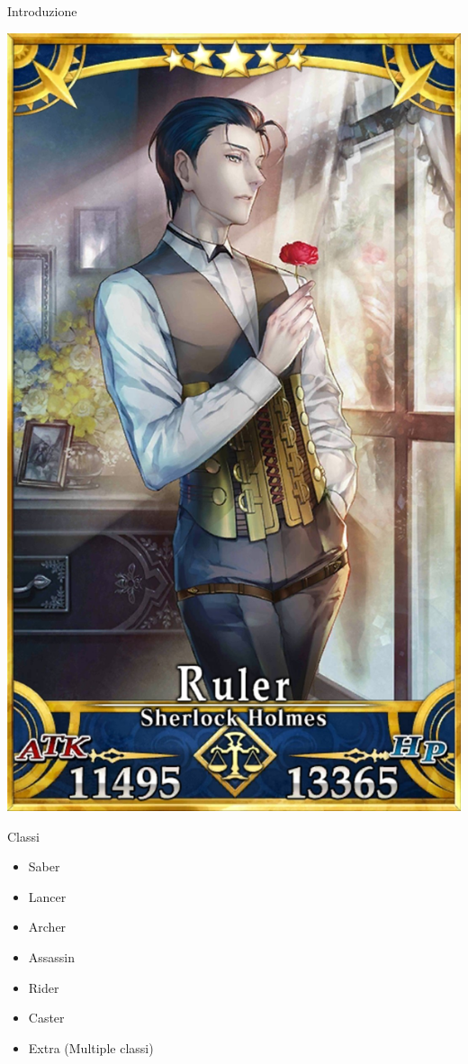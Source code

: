 \documentclass{beamer}
\begin{document}
\begin{darkframes}
\begin{frame}{Introduzione}
\begin{varwidth}{\textwidth}
      \includegraphics[height=0.75\textheight]{./images/servant.png}
    \end{varwidth}
  \end{frame}

  \begin{frame}{Classi}
    \begin{itemize}
      \item Saber
      \item Lancer
      \item Archer
      \item Assassin
      \item Rider
      \item Caster
      \item Extra (Multiple classi)
    \end{itemize}
  \end{frame}


\end{darkframes}
\end{document}
